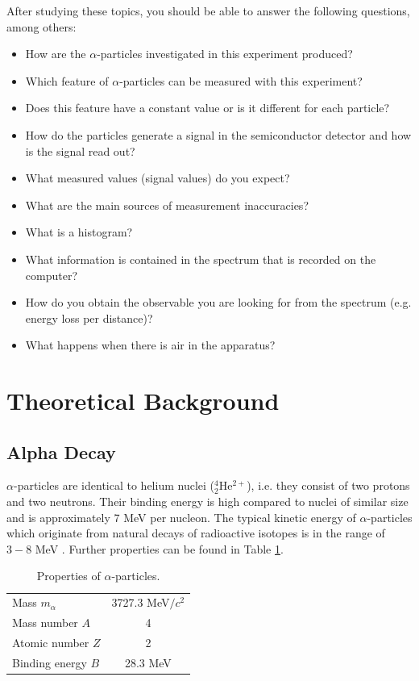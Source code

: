 After studying these topics, you should be able to answer the following questions, among others:
\begin{itemize}[itemsep=0pt]
	\item How are the $\alpha$-particles investigated in this experiment produced?
	\item Which feature of $\alpha$-particles can be measured with this experiment? 
	\item Does this feature have a constant value or is it different for each particle?
	\item How do the particles generate a signal in the semiconductor detector and how is the signal read out?
	\item What measured values (signal values) do you expect?
	\item What are the main sources of measurement inaccuracies?
	\item What is a histogram?
	\item What information is contained in the spectrum that is recorded on the computer?
	\item How do you obtain the observable you are looking for from the spectrum (e.g. energy loss per distance)?
	\item What happens when there is air in the apparatus?
\end{itemize}
%
\newpage
\section{Theoretical Background}
\label{sec:theory}
%
\subsection{Alpha Decay}

$\alpha$-particles are identical to helium nuclei ($^4_2$He$^{2+}$), i.e. they consist of two protons and two neutrons. Their binding energy is high compared to nuclei of similar size and is approximately 7 MeV per nucleon. The typical kinetic energy of $\alpha$-particles which originate from natural decays of radioactive isotopes is in the range of $3-8$ MeV  \cite{povh-rith}. Further properties can be found in Table \ref{tab:alpha}.
\begin{table}[h]
	\centering
	\begin{tabular}{lc}
		Mass $m_\alpha$    & 3727.3 MeV$/c^{2}$ \\
		Mass number $A$        & 4    \\
		Atomic number $Z$   & 2    \\
		Binding energy $B$   & 28.3 MeV \\
	\end{tabular}
	\caption{Properties of $\alpha$-particles.}\label{tab:alpha}
\end{table}

